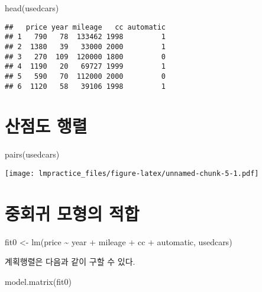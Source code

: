 \documentclass[
]{book}
\newenvironment{Shaded}{\begin{snugshade}}{\end{snugshade}}
\newcommand{\FunctionTok}[1]{\textcolor[rgb]{0.00,0.00,0.00}{#1}}
\newcommand{\NormalTok}[1]{#1}
\newcommand{\OtherTok}[1]{\textcolor[rgb]{0.56,0.35,0.01}{#1}}
\newcommand{\SpecialCharTok}[1]{\textcolor[rgb]{0.00,0.00,0.00}{#1}}
\begin{document}
\begin{Shaded}
\begin{Highlighting}[]
\FunctionTok{head}\NormalTok{(usedcars)}
\end{Highlighting}
\end{Shaded}

\begin{verbatim}
##   price year mileage   cc automatic
## 1   790   78  133462 1998         1
## 2  1380   39   33000 2000         1
## 3   270  109  120000 1800         0
## 4  1190   20   69727 1999         1
## 5   590   70  112000 2000         0
## 6  1120   58   39106 1998         1
\end{verbatim}

\hypertarget{uxc0b0uxc810uxb3c4-uxd589uxb82c}{%
\section{산점도 행렬}\label{uxc0b0uxc810uxb3c4-uxd589uxb82c}}

\begin{Shaded}
\begin{Highlighting}[]
\FunctionTok{pairs}\NormalTok{(usedcars)}
\end{Highlighting}
\end{Shaded}

\texttt{[image: lmpractice\_files/figure-latex/unnamed-chunk-5-1.pdf]}

\hypertarget{uxc911uxd68cuxadc0-uxbaa8uxd615uxc758-uxc801uxd569}{%
\section{중회귀 모형의 적합}\label{uxc911uxd68cuxadc0-uxbaa8uxd615uxc758-uxc801uxd569}}

\begin{Shaded}
\begin{Highlighting}[]
\NormalTok{fit0 }\OtherTok{\textless{}{-}} \FunctionTok{lm}\NormalTok{(price }\SpecialCharTok{\textasciitilde{}}\NormalTok{ year }\SpecialCharTok{+}\NormalTok{ mileage }\SpecialCharTok{+}\NormalTok{ cc }\SpecialCharTok{+}\NormalTok{ automatic, usedcars)}
\end{Highlighting}
\end{Shaded}

계획행렬은 다음과 같이 구할 수 있다.

\begin{Shaded}
\begin{Highlighting}[]
\FunctionTok{model.matrix}\NormalTok{(fit0)}
\end{Highlighting}
\end{Shaded}
\end{document}
